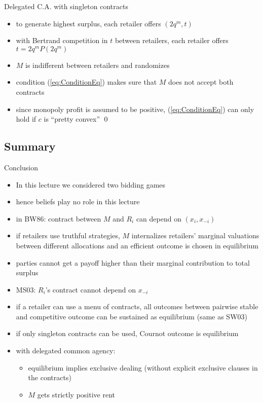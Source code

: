 \documentclass[11pt,english]{beamer}
\begin{document}
\begin{frame}[allowframebreaks]{Delegated C.A. with singleton contracts}
\begin{enumerate}
\begin{itemize}
      \item to generate highest surplus, each retailer offers $(2q^m,t)$
      \item with Bertrand competition in $t$ between retailers, each
        retailer offers $t = 2q^m P(2q^m)$
      \item $M$ is indifferent between retailers and randomizes
      \item condition (\ref{eq:ConditionEq}) makes sure that $M$ does
        not accept both contracts
      \item since monopoly profit is assumed to be positive,
        (\ref{eq:ConditionEq}) can only hold if $c$ is ``pretty
        convex'' \qed
      \end{itemize}
    \end{enumerate}
\end{frame}

\subsection{Summary}

\begin{frame}[allowframebreaks]{Conclusion}
  \begin{itemize}
  \item In this lecture we considered two bidding games
  \item hence beliefs play no role in this lecture
  \item in BW86: contract between $M$ and $R_i$ can depend on $(x_i,x_{-i})$
  \item if retailers use truthful strategies, $M$ internalizes
    retailers' marginal valuations between different allocations and
    an efficient outcome is chosen in equilibrium
  \item parties cannot get a payoff higher than their marginal contribution to
    total surplus
  \item MS03: $R_i$'s contract cannot depend on $x_{-i}$
  \item if a retailer can use a menu of contracts, all outcomes
    between pairwise stable and competitive outcome can be sustained
    as equilibrium (same as SW03)
  \item if only singleton contracts can be used, Cournot outcome is equilibrium
  \item with delegated common agency:
    \begin{itemize}
    \item equilibrium implies exclusive dealing (without explicit
      exclusive clauses in the contracts)
    \item $M$ gets strictly positive rent
    \end{itemize}
  \end{itemize}
\end{frame}
\end{document}

